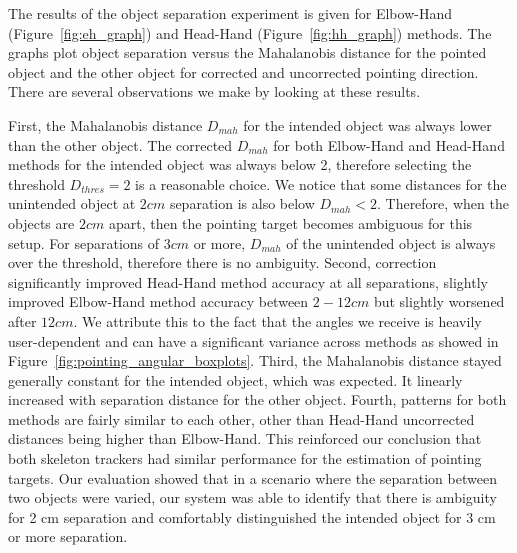 The results of the object separation experiment is given for Elbow-Hand (Figure~\ref{fig:eh_graph}) and Head-Hand (Figure~\ref{fig:hh_graph}) methods. The graphs plot object separation versus the Mahalanobis distance for the pointed object and the other object for corrected and uncorrected pointing direction. There are several observations we make by looking at these results.

First, the Mahalanobis distance $D_{mah}$ for the intended object was always lower than the other object. The corrected $D_{mah}$ for both Elbow-Hand and Head-Hand methods for the intended object was always below 2, therefore selecting the threshold $D_{thres}=2$ is a reasonable choice. We notice that some distances for the unintended object at $2cm$ separation is also below $D_{mah}<2$. Therefore, when the objects are $2 cm$ apart, then the pointing target becomes ambiguous for this setup. For separations of $3cm$ or more, $D_{mah}$ of the unintended object is always over the threshold, therefore there is no ambiguity. Second, correction significantly improved Head-Hand method accuracy at all separations, slightly improved Elbow-Hand method accuracy between $2-12cm$ but slightly worsened after $12cm$. We attribute this to the fact that the angles we receive is heavily user-dependent and can have a significant variance across methods as showed in Figure~\ref{fig:pointing_angular_boxplots}. Third, the Mahalanobis distance stayed generally constant for the intended object, which was expected. It linearly increased with separation distance for the other object. Fourth, patterns for both methods are fairly similar to each other, other than Head-Hand uncorrected distances being higher than Elbow-Hand. This reinforced our conclusion that both skeleton trackers had similar performance for the estimation of pointing targets. Our evaluation showed that in a scenario where the separation between two objects were varied, our system was able to identify that there is ambiguity for 2 cm separation and comfortably distinguished the intended object for 3 cm or more separation.
